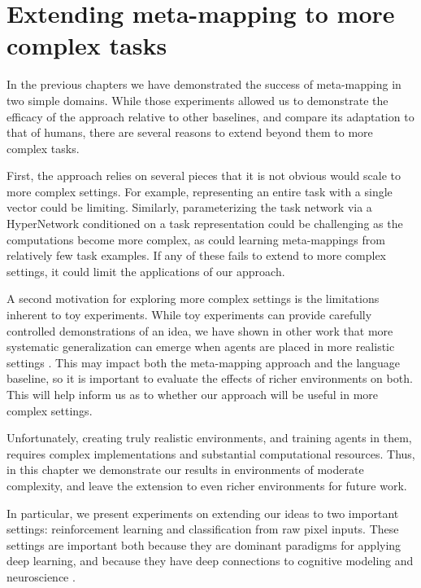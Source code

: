 \chapter{Extending meta-mapping to more complex tasks} \label{chapter:extending}
In the previous chapters we have demonstrated the success of meta-mapping in two simple domains. While those experiments allowed us to demonstrate the efficacy of the approach relative to other baselines, and compare its adaptation to that of humans, there are several reasons to extend beyond them to more complex tasks. \par 
First, the approach relies on several pieces that it is not obvious would scale to more complex settings. For example, representing an entire task with a single vector could be limiting. Similarly, parameterizing the task network via a HyperNetwork conditioned on a task representation could be challenging as the computations become more complex, as could learning meta-mappings from relatively few task examples. If any of these fails to extend to more complex settings, it could limit the applications of our approach. \par
A second motivation for exploring more complex settings is the limitations inherent to toy experiments. While toy experiments can provide carefully controlled demonstrations of an idea, we have shown in other work that more systematic generalization can emerge when agents are placed in more realistic settings \citep{Hill2019a}. This may impact both the meta-mapping approach and the language baseline, so it is important to evaluate the effects of richer environments on both. This will help inform us as to whether our approach will be useful in more complex settings. \par
Unfortunately, creating truly realistic environments, and training agents in them, requires complex implementations and substantial computational resources. Thus, in this chapter we demonstrate our results in environments of moderate complexity, and leave the extension to even richer environments for future work.\par 
In particular, we present experiments on extending our ideas to two important settings: reinforcement learning and classification from raw pixel inputs. These settings are important both because they are dominant paradigms for applying deep learning, and because they have deep connections to cognitive modeling and neuroscience \citep[e.g.][]{Yamins2014, Kriegeskorte2015, Momennejad2017}. \par


